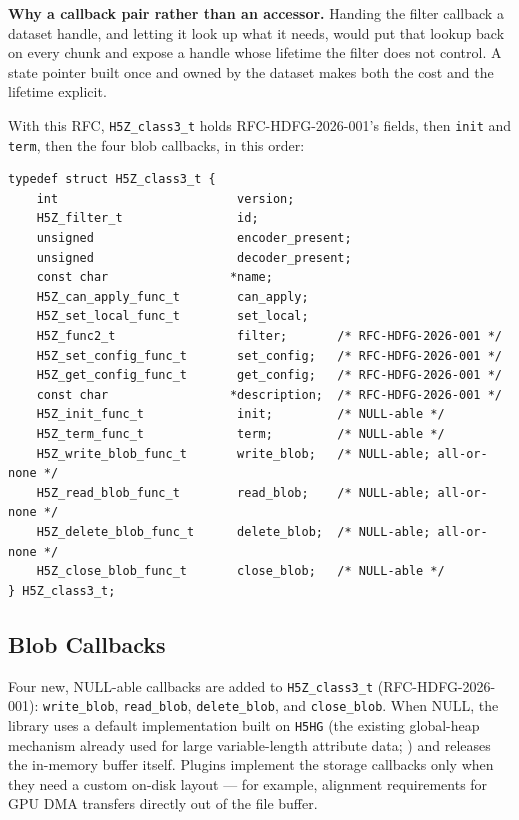 \documentclass[../RFC-HDFG-2026-003.tex]{subfiles}
\begin{document}
\textbf{Why a callback pair rather than an accessor.}  Handing the filter
callback a dataset handle, and letting it look up what it needs, would
put that lookup back on every chunk and expose a handle whose lifetime
the filter does not control.  A state pointer built once and owned by
the dataset makes both the cost and the lifetime explicit.


With this RFC, \texttt{H5Z\_class3\_t} holds RFC-HDFG-2026-001's
fields, then \texttt{init} and \texttt{term}, then the four blob
callbacks, in this order:

\begin{verbatim}
typedef struct H5Z_class3_t {
    int                         version;
    H5Z_filter_t                id;
    unsigned                    encoder_present;
    unsigned                    decoder_present;
    const char                 *name;
    H5Z_can_apply_func_t        can_apply;
    H5Z_set_local_func_t        set_local;
    H5Z_func2_t                 filter;       /* RFC-HDFG-2026-001 */
    H5Z_set_config_func_t       set_config;   /* RFC-HDFG-2026-001 */
    H5Z_get_config_func_t       get_config;   /* RFC-HDFG-2026-001 */
    const char                 *description;  /* RFC-HDFG-2026-001 */
    H5Z_init_func_t             init;         /* NULL-able */
    H5Z_term_func_t             term;         /* NULL-able */
    H5Z_write_blob_func_t       write_blob;   /* NULL-able; all-or-none */
    H5Z_read_blob_func_t        read_blob;    /* NULL-able; all-or-none */
    H5Z_delete_blob_func_t      delete_blob;  /* NULL-able; all-or-none */
    H5Z_close_blob_func_t       close_blob;   /* NULL-able */
} H5Z_class3_t;
\end{verbatim}

\subsection{Blob Callbacks}
\label{sec:blob-callbacks}

Four new, NULL-able callbacks are added to \texttt{H5Z\_class3\_t}
(RFC-HDFG-2026-001): \texttt{write\_blob}, \texttt{read\_blob},
\texttt{delete\_blob}, and \texttt{close\_blob}. When NULL, the library
uses a default implementation built on \texttt{H5HG} (the existing
global-heap mechanism already used for large variable-length attribute
data; ) and releases the in-memory
buffer itself. Plugins implement the storage callbacks only when they
need a custom on-disk layout --- for example, alignment requirements
for GPU DMA transfers directly out of the file buffer.
\end{document}
